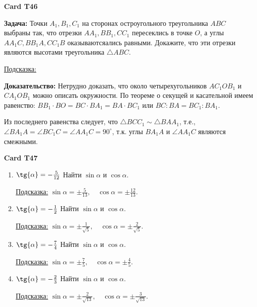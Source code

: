 \documentclass[12pt,a4paper]{article}
\begin{document}
\noindent\textbf{Card T46}
\medskip  
{}

\textbf{Задача: }Точки \( A_1, B_1, C_1 \) на сторонах остроугольного треугольника \( ABC \) выбраны так, что отрезки \( AA_1, BB_1, CC_1 \) пересеклись в точке \( O \), а углы \( AA_1C, BB_1A, CC_1B \) оказываютсяались равными. Докажите, что эти отрезки являются высотами треугольника \( \triangle ABC \).

\medskip
\noindent \underline{Подсказка:}

\textbf{Доказательство:} 
Нетрудно доказать, что около четырехугольников \( AC_1OB_1 \) и \( CA_1OB_1 \) можно описать окружности. По теореме о секущей и касательной имеем равенство:
$BB_1 \cdot BO=BC \cdot BA_1 = BA \cdot BC_1$ или
$BC : BA = BC_1 : BA_1$.

Из последнего равенства следует, что \( \triangle BCC_1 \sim \triangle BAA_1 \), т.е., \( \angle BA_1A = \angle BC_1C = \angle AA_1C = 90^\circ \), т.к. углы \( BA_1A\) и \( \angle AA_1C \) являются смежными.

\bigskip
{}
\noindent\textbf{Card T47}
\medskip  
{}

\begin{enumerate}
	\item \(\tg{\alpha} = -\frac{5}{12}\) \quad Найти \(\sin{\alpha}\) и \(\cos{\alpha}\).
	
	\medskip
	\noindent \underline{Подсказка:}
$	\sin{\alpha} = \pm \frac{5}{13}, \quad \cos{\alpha} = \pm \frac{12}{13}$.

	\item \(\tg{\alpha} = -\frac{1}{2}\) \quad Найти \(\sin{\alpha}\) и \(\cos{\alpha}\).
	
	\medskip
	\noindent \underline{Подсказка:}
$	\sin{\alpha} = \pm \frac{1}{\sqrt{5}}, \quad \cos{\alpha} = \pm \frac{2}{\sqrt{5}}$.

	\item \(\tg{\alpha} = -\frac{7}{4}\) \quad Найти \(\sin{\alpha}\) и \(\cos{\alpha}\).
	
	\medskip
	\noindent \underline{Подсказка:}
$	\sin{\alpha} = \pm \frac{7}{5}, \quad \cos{\alpha} = \pm \frac{4}{5}$.

	\item \(\tg{\alpha} = -\frac{2}{3}\) \quad Найти \(\sin{\alpha}\) и \(\cos{\alpha}\).
	
	\medskip
	\noindent \underline{Подсказка:}
$	\sin{\alpha} = \pm \frac{2}{\sqrt{13}}, \quad \cos{\alpha} = \pm \frac{3}{\sqrt{13}}$.
\end{enumerate}
\end{document}
